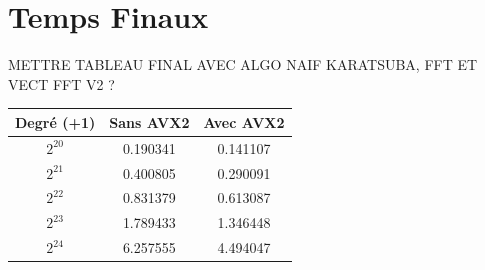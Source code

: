 \documentclass[12pt, a4paper]{article}
\begin{document}
\section{Temps Finaux}

METTRE TABLEAU FINAL AVEC ALGO NAIF KARATSUBA, FFT ET VECT FFT V2 ?

\begin{center}
\begin{tabular}{||c c c||}
\hline
Degré (+1) & Sans AVX2 & Avec AVX2 \\
\hline\hline
$2^{20}$ & 0.190341 & 0.141107 \\
\hline
$2^{21}$ & 0.400805 & 0.290091 \\
\hline
$2^{22}$ & 0.831379 & 0.613087 \\
\hline
$2^{23}$ & 1.789433 & 1.346448 \\
\hline
$2^{24}$ & 6.257555 & 4.494047 \\
\hline
\end{tabular}
\end{center}

\newpage



\end{document}
